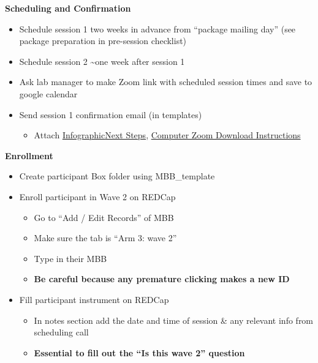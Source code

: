\documentclass[]{book}
\providecommand{\tightlist}{%
  \setlength{\itemsep}{0pt}\setlength{\parskip}{0pt}}
\begin{document}
\textbf{Scheduling and Confirmation}

\begin{itemize}
\item
  Schedule session 1 two weeks in advance from ``package mailing day'' (see package preparation in pre-session checklist)
\item
  Schedule session 2 \textasciitilde{}one week after session 1
\item
  Ask lab manager to make Zoom link with scheduled session times and save to google calendar
\item
  Send session 1 confirmation email (in templates)

  \begin{itemize}
  \tightlist
  \item
    Attach \href{https://app.box.com/file/776654994352}{Infographic}\href{https://app.box.com/file/774936561660}{Next Steps}, \href{https://ucla.app.box.com/file/680632734387}{Computer Zoom Download Instructions}
  \end{itemize}
\end{itemize}

\textbf{Enrollment}

\begin{itemize}
\tightlist
\item
  Create participant Box folder using MBB\_template\\
\item
  Enroll participant in Wave 2 on REDCap

  \begin{itemize}
  \tightlist
  \item
    Go to ``Add / Edit Records'' of MBB
  \item
    Make sure the tab is ``Arm 3: wave 2''
  \item
    Type in their MBB
  \item
    \textbf{Be careful because any premature clicking makes a new ID}
  \end{itemize}
\item
  Fill participant instrument on REDCap

  \begin{itemize}
  \tightlist
  \item
    In notes section add the date and time of session \& any relevant info from scheduling call\\
  \item
    \textbf{Essential to fill out the ``Is this wave 2'' question}
  \end{itemize}
\end{itemize}
\end{document}

